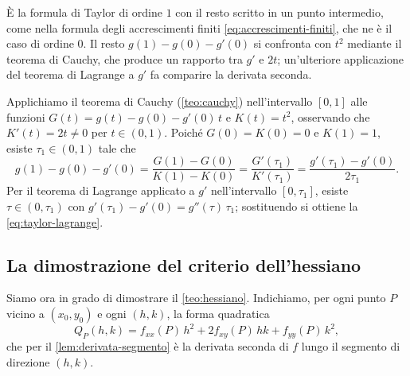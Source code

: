 \begin{schema}
\end{schema}

\begin{strategia}
È la formula di Taylor di ordine $1$ con il resto scritto in un punto intermedio, come
nella formula degli accrescimenti finiti \eqref{eq:accrescimenti-finiti}, che ne è il
caso di ordine $0$. Il resto $g(1)-g(0)-g'(0)$ si confronta con $t^{2}$ mediante il teorema
di Cauchy, che produce un rapporto tra $g'$ e $2t$; un'ulteriore applicazione del
teorema di Lagrange a $g'$ fa comparire la derivata seconda.
\end{strategia}

\begin{dimostrazione}
Applichiamo il teorema di Cauchy (\cref{teo:cauchy}) nell'intervallo $[0,1]$ alle
funzioni $G(t)=g(t)-g(0)-g'(0)\,t$ e $K(t)=t^{2}$, osservando che $K'(t)=2t\neq0$ per
$t\in(0,1)$. Poiché $G(0)=K(0)=0$ e $K(1)=1$, esiste $\tau_{1}\in(0,1)$ tale che
\[
  g(1)-g(0)-g'(0)=\frac{G(1)-G(0)}{K(1)-K(0)}=\frac{G'(\tau_{1})}{K'(\tau_{1})}
  =\frac{g'(\tau_{1})-g'(0)}{2\tau_{1}} .
\]
Per il teorema di Lagrange applicato a $g'$ nell'intervallo $[0,\tau_{1}]$, esiste
$\tau\in(0,\tau_{1})$ con $g'(\tau_{1})-g'(0)=g''(\tau)\,\tau_{1}$; sostituendo si ottiene la
\eqref{eq:taylor-lagrange}.
\end{dimostrazione}

\subsection{La dimostrazione del criterio dell'hessiano}
\label{sec:dim-hessiano}

Siamo ora in grado di dimostrare il \cref{teo:hessiano}. Indichiamo, per ogni punto $P$
vicino a $(x_{0},y_{0})$ e ogni $(h,k)$, la forma quadratica
\begin{equation}\label{eq:forma-quadratica}
  Q_{P}(h,k)=f_{xx}(P)\,h^{2}+2f_{xy}(P)\,hk+f_{yy}(P)\,k^{2} ,
\end{equation}
che per il \cref{lem:derivata-segmento} è la derivata seconda di $f$ lungo il segmento di
direzione $(h,k)$.

